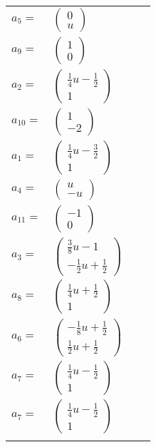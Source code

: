 \documentclass[1p]{elsarticle_modified}
\theoremstyle{definition}
\begin{document}
\begin{tabular}{m{7pt} m{180pt} m{7pt} m{180pt} }
\flushright $a_{5}=$&$\begin{pmatrix}0\\u\end{pmatrix}$ \\
\flushright $a_{9}=$&$\begin{pmatrix}1\\0\end{pmatrix}$ \\
\flushright $a_{2}=$&$\begin{pmatrix}\frac{1}{4} u-\frac{1}{2}\\1\end{pmatrix}$ \\
\flushright $a_{10}=$&$\begin{pmatrix}1\\-2\end{pmatrix}$ \\
\flushright $a_{1}=$&$\begin{pmatrix}\frac{1}{4} u-\frac{3}{2}\\1\end{pmatrix}$ \\
\flushright $a_{4}=$&$\begin{pmatrix}u\\- u\end{pmatrix}$ \\
\flushright $a_{11}=$&$\begin{pmatrix}-1\\0\end{pmatrix}$ \\
\flushright $a_{3}=$&$\begin{pmatrix}\frac{3}{8} u-1\\-\frac{1}{2} u+\frac{1}{2}\end{pmatrix}$ \\
\flushright $a_{8}=$&$\begin{pmatrix}\frac{1}{4} u+\frac{1}{2}\\1\end{pmatrix}$ \\
\flushright $a_{6}=$&$\begin{pmatrix}-\frac{1}{8} u+\frac{1}{2}\\\frac{1}{2} u+\frac{1}{2}\end{pmatrix}$ \\
\flushright $a_{7}=$&$\begin{pmatrix}\frac{1}{4} u-\frac{1}{2}\\1\end{pmatrix}$\\ \flushright $a_{7}=$&$\begin{pmatrix}\frac{1}{4} u-\frac{1}{2}\\1\end{pmatrix}$\\&\end{tabular}
\end{document}
